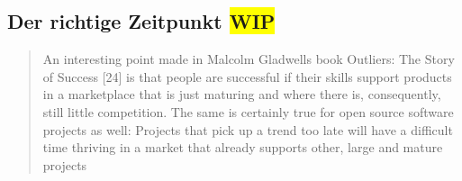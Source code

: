 \subsection{Der richtige Zeitpunkt \colorbox{yellow}{WIP}}



\begin{quote}
    \begin{tcolorbox}[colback=black!5!white,colframe=white!75!black,title=Direkt Zitat aus \cite{bangerthWhatMakesComputational2013} Kapitel 3.1]
        An interesting point made in Malcolm Gladwells book Outliers: The Story of Success [24] is that people
        are successful if their skills support products in a marketplace that is just maturing and where there is,
        consequently, still little competition. The same is certainly true for open source software projects as well:
        Projects that pick up a trend too late will have a difficult time thriving in a market that already supports other,
        large and mature projects
    \end{tcolorbox}
\end{quote}